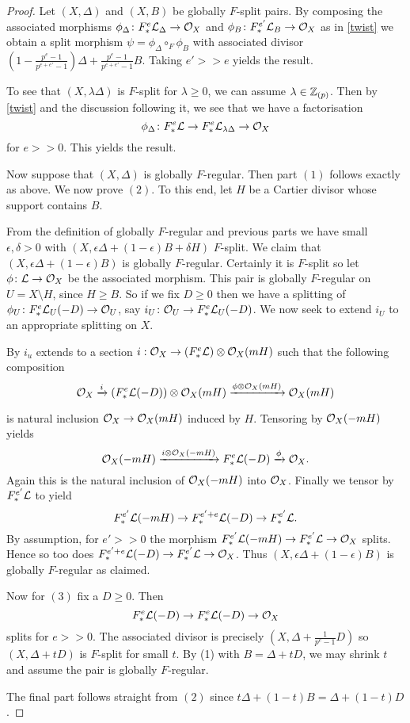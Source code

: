 \begin{proof}
	Let $(X,\Delta)$ and $(X,B)$ be globally $F$-split pairs. By composing the associated morphisms $\phi_{\Delta} \colon \Fe \mathcal{L}_{\Delta} \to \ox$ and $\phi_{B} \colon \Fe[e'] \mathcal{L}_{B} \to \ox$ as in \autoref{twist} we obtain a split morphism $\psi=\phi_{\Delta}\circ_{F} \phi_{B}$ with associated divisor $(1-\frac{p^{e}-1}{p^{e+e'}-1})\Delta+ \frac{p^{e}-1}{p^{e+e'}-1}B$. Taking $e'>>e$ yields the result. 
	
	To see that $(X,\lambda \Delta)$ is $F$-split for $\lambda \geq 0$, we can assume $\lambda \in \zp$. Then by \autoref{twist} and the discussion following it, we see that we have a factorisation $$\phi_{\Delta} \colon \Fe \mathcal{L} \to \Fe \mathcal{L}_{\lambda \Delta} \to \ox$$ for $e>>0$. This yields the result.
	
	Now suppose that $(X,\Delta)$ is globally $F$-regular. Then part $(1)$ follows exactly as above. We now prove $(2)$. To this end, let $H$ be a Cartier divisor whose support contains $B$. 
	
	From the definition of globally $F$-regular and previous parts we have small $\epsilon, \delta > 0$ with $(X,\epsilon \Delta +(1-\epsilon)B+\delta H)$ $F$-split. We claim that $(X,\epsilon \Delta +(1-\epsilon)B)$ is globally $F$-regular. Certainly it is $F$-split so let $\phi\colon \mathcal{L} \to \ox$ be the associated morphism. This pair is globally $F$-regular on $U=X\setminus H$, since $H \geq B$. So if we fix $D\geq 0$ then we have a splitting of $\phi_{U}\colon \Fe \mathcal{L}_{U}(-D) \to \ox[U]$, say $i_{U}\colon \ox[U] \to \Fe \mathcal{L}_{U}(-D)$. We now seek to extend $i_{U}$ to an appropriate splitting on $X$.
	
	By \cite[Chapter II, Lemma 5.14(b)]{Ha77} $i_{u}$ extends to a section $i:\ox \to (\Fe \mathcal{L}) \otimes \ox(mH)$ such that the following composition 
	\[\ox \xrightarrow{i} (\Fe \mathcal{L}(-D)) \otimes \ox(mH) \xrightarrow{\phi\otimes\ox(mH)} \ox(mH)\]
	
	is natural inclusion $\ox \to \ox(mH)$ induced by $H$. Tensoring by $\ox(-mH)$ yields
	\[\ox(-mH) \xrightarrow{i\otimes \ox(-mH)} \Fe \mathcal{L}(-D) \xrightarrow{\phi} \ox.\]
	Again this is the natural inclusion of $\ox(-mH)$ into $\ox$. Finally we tensor by $\Fe[e']\mathcal{L}$ to yield
	$$\Fe[e']\mathcal{L}(-mH) \to \Fe[e'+e]\mathcal{L}(-D) \to \Fe[e']\mathcal{L}.$$
	By assumption, for $e'>>0$ the morphism $\Fe[e']\mathcal{L}(-mH) \to  \Fe[e']\mathcal{L} \to \ox$ splits. Hence so too does $\Fe[e'+e]\mathcal{L}(-D) \to \Fe[e']\mathcal{L} \to \ox$. Thus $(X,\epsilon \Delta +(1-\epsilon)B)$ is globally $F$-regular as claimed.
		
	Now for $(3)$ fix a $D \geq 0$. Then $$\Fe \mathcal{L}(-D) \to \Fe \mathcal{L}(-D) \to \ox $$ splits for $e>>0$. The associated divisor is precisely $(X,\Delta+\frac{1}{p^{e}-1}D)$ so $(X,\Delta+tD)$ is $F$-split for small $t$. By (1) with $B=\Delta+tD$, we may shrink $t$ and assume the pair is globally $F$-regular. 
	
	The final part follows straight from $(2)$ since $t\Delta+(1-t)B=\Delta+(1-t)D$.
	
\end{proof}
